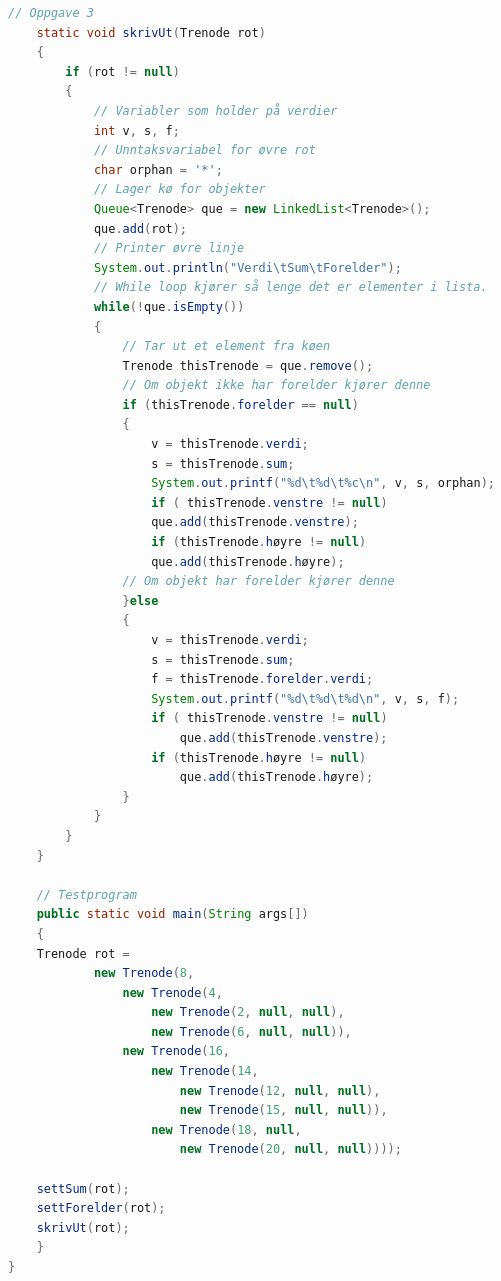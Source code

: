 \documentclass[twocolumn]{article}
\begin{document}
\begin{lstlisting}[language=Java, frame=single]
    // Oppgave 3
    static void skrivUt(Trenode rot)
    {
        if (rot != null)
        {
            // Variabler som holder på verdier
            int v, s, f;
            // Unntaksvariabel for øvre rot
            char orphan = '*';
            // Lager kø for objekter
            Queue<Trenode> que = new LinkedList<Trenode>();
            que.add(rot);
            // Printer øvre linje
            System.out.println("Verdi\tSum\tForelder");
            // While loop kjører så lenge det er elementer i lista.
            while(!que.isEmpty())
            {
                // Tar ut et element fra køen
                Trenode thisTrenode = que.remove();
                // Om objekt ikke har forelder kjører denne
                if (thisTrenode.forelder == null)
                {
                    v = thisTrenode.verdi;
                    s = thisTrenode.sum;
                    System.out.printf("%d\t%d\t%c\n", v, s, orphan);
                    if ( thisTrenode.venstre != null)
                    que.add(thisTrenode.venstre);
                    if (thisTrenode.høyre != null)
                    que.add(thisTrenode.høyre);
                // Om objekt har forelder kjører denne
                }else
                {
                    v = thisTrenode.verdi;
                    s = thisTrenode.sum;
                    f = thisTrenode.forelder.verdi;
                    System.out.printf("%d\t%d\t%d\n", v, s, f);
                    if ( thisTrenode.venstre != null)
                        que.add(thisTrenode.venstre);
                    if (thisTrenode.høyre != null)
                        que.add(thisTrenode.høyre);
                }
            }
        }
    }

    // Testprogram
    public static void main(String args[])
    {
	Trenode rot =
            new Trenode(8,
                new Trenode(4,
                    new Trenode(2, null, null),
                    new Trenode(6, null, null)),
                new Trenode(16,
                    new Trenode(14,
                        new Trenode(12, null, null),
                        new Trenode(15, null, null)),
                    new Trenode(18, null,
                        new Trenode(20, null, null))));
	
	settSum(rot);
	settForelder(rot);
	skrivUt(rot);
    }
}
\end{lstlisting}
\end{document}
